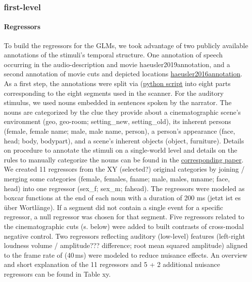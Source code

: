 \documentclass[english]{article}
\begin{document}
\subsubsection{first-level}
\paragraph{Regressors }
To build the regressors for the GLMs, we took advantage of two publicly available annotations of the stimuli's temporal structure. One annotation of speech occurring in the audio-description and movie {haeusler2019annotation}, and a second annotation of movie cuts and depicted locations \href{https://f1000research.com/articles/5-2273}{haeusler2016annotation}. As a first step, the annotations were split via (\href{"https://github.com/chrhaeusler/studyforrest-data-annotations/blob/master/code/researchcut2segments.py"}{python script} into eight parts corresponding to the eight segments used in the scanner. 
For the auditory stimulus, we used nouns embedded in sentences spoken by the narrator. The nouns are categorized by the clue they provide about a cinematographic scene's environment  (geo, geo-room; setting\_new, setting\_old), its inherent persons (female, female name; male, male name, person), a person's appearance (face, head; body, bodypart), and a scene's inherent objects (object, furniture). Details on procedure to annotate the stimuli on a single-world level and details on the rules to manually categorize the nouns can be found in the \href{"https://www.overleaf.com/project/5d4ab1b759001b5db6ea2bc3"}{corresponding paper}. We created 11 regressors from the XY (selected?) original categories by joining / merging some categories (female, females, fname; male, males, mname; face, head) into one regressor (sex\_f; sex\_m; fahead). The regressors were modeled as boxcar functions at the end of each noun with a duration of 200 ms (jetzt ist es über Wortlänge). If a segment did not contain a single event for a specific regressor, a null regressor was chosen for that segment. Five regressors related to the cinematographic cuts (s. below) were added to built contrasts of cross-modal negative control. Two regressors reflecting auditory (low-level) features (left-right loudness volume / amplitude??? difference; root mean squared amplitude) aligned to the frame rate of (40\,ms) were modeled to reduce nuisance effects. An overview and short explanation of the 11 regressors and 5 + 2 additional nuisance regressors can be found in Table xy. 
\end{document}
